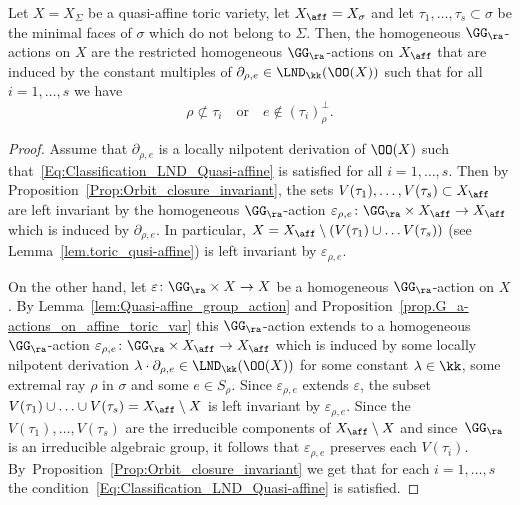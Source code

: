 \begin{corollary}
\label{Cor:Classification_LND_Quasi-affine}
Let $X = X_{\Sigma}$ be a quasi-affine toric variety, let $X_{\aff} = X_\sigma$ and let $\tau_1, \ldots, \tau_s \subset \sigma$
be the minimal faces of $\sigma$ which do not belong to $\Sigma$. Then, the homogeneous
$\GG_\ra$-actions on $X$ are the restricted homogeneous $\GG_\ra$-actions on $X_{\aff}$ that
are induced by the constant multiples of $\partial_{\rho, e} \in \LND_{\kk}(\OO(X))$
such that
for all $i = 1, \ldots, s$ we have
\[
\label{Eq:Classification_LND_Quasi-affine}
\tag{$\circledast$}
\rho \not\subset \tau_i \quad \textrm{or} \quad e \not\in (\tau_i)_{\rho}^\bot.
\]
\end{corollary}

\begin{proof}
Assume that $\partial_{\rho, e}$ is a locally nilpotent derivation of $\OO(X)$
such that~\eqref{Eq:Classification_LND_Quasi-affine} is satisfied for all $i =1, \ldots, s$.
Then by Proposition~\ref{Prop:Orbit_closure_invariant}, the sets $V(\tau_1), \ldots, V(\tau_s) \subset X_{\aff}$
are left invariant by the homogeneous $\GG_\ra$-action
$\varepsilon_{\rho, e} \colon \GG_\ra \times X_{\aff} \to X_{\aff}$
which is induced by $\partial_{\rho, e}$.
In particular, $X = X_{\aff} \setminus (V(\tau_1) \cup \ldots V(\tau_s))$ (see Lemma~\ref{lem.toric_qusi-affine}) is left
invariant by $\varepsilon_{\rho, e}$.

On the other hand, let $\varepsilon \colon \GG_\ra \times X \to X$ be a homogeneous $\GG_\ra$-action on $X$.
By Lemma~\ref{lem:Quasi-affine_group_action} and Proposition~\ref{prop.G_a-actions_on_affine_toric_var}
this $\GG_\ra$-action extends to a homogeneous $\GG_\ra$-action
$\varepsilon_{\rho, e} \colon \GG_\ra \times X_{\aff} \to X_{\aff}$ which is induced
by some locally nilpotent derivation $\lambda \cdot \partial_{\rho, e} \in \LND_{\kk}(\OO(X))$ for some
constant $\lambda \in \kk$, some
extremal ray $\rho$ in $\sigma$ and some $e \in S_{\rho}$. Since $\varepsilon_{\rho, e}$ extends
$\varepsilon$, the subset $V(\tau_1) \cup \ldots \cup V(\tau_s) = X_{\aff} \setminus X$ is left
invariant by $\varepsilon_{\rho, e}$. Since the $V(\tau_1), \ldots, V(\tau_s)$ are the
irreducible components of $X_{\aff} \setminus X$ and since~$\GG_\ra$ is an irreducible algebraic group, it follows that $\varepsilon_{\rho, e}$ preserves each $V(\tau_i)$.
By~Proposition~\ref{Prop:Orbit_closure_invariant} we get that for each $i=1, \ldots, s$
the condition~\eqref{Eq:Classification_LND_Quasi-affine} is satisfied.
\end{proof}

